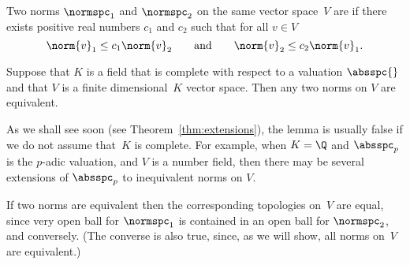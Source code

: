\begin{definition}[Equivalent]
  Two norms $\normspc_1$ and $\normspc_2$ on the same vector space~$V$
  are  if there exists positive real numbers $c_1$ and $c_2$
  such that for all $v\in V$
$$
  \norm{v}_1 \leq c_1 \norm{v}_2
  \qquad\text{and}\qquad
  \norm{v}_2 \leq c_2 \norm{v}_1.
$$
\end{definition}

\begin{lemma}\label{lem:ext_unique}
Suppose that $K$ is a field that is complete with respect to a valuation
$\absspc{}$ and that $V$ is a finite dimensional~$K$ vector space.  
Then any two norms on $V$ are equivalent.
\end{lemma}
\begin{remark}
  As we shall see soon (see Theorem~\ref{thm:extensions}), the lemma
  is usually false if we do not assume that~$K$ is complete.  For
  example, when $K=\Q$ and $\absspc_p$ is the $p$-adic valuation, and
  $V$ is a number field, then there may be several extensions of
  $\absspc_p$ to inequivalent norms on $V$.
\end{remark}
If two norms are equivalent then the corresponding topologies on~$V$
are equal, since very open ball for $\normspc_1$ is contained in an
open ball for $\normspc_2$, and conversely. (The converse is also
true, since, as we will show, all norms on~$V$ are equivalent.)
